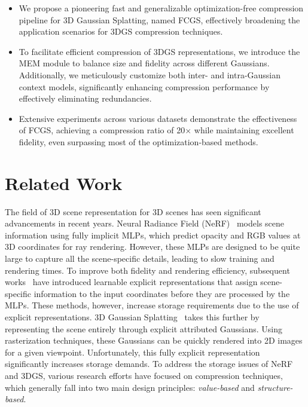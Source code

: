 \documentclass{article} %
\begin{document}
\begin{itemize} 
    \item We propose a pioneering fast and generalizable optimization-free compression pipeline for 3D Gaussian Splatting, named FCGS, effectively broadening the application scenarios for 3DGS compression techniques. 
    \item To facilitate  efficient compression of 3DGS representations, we introduce the MEM module to balance size and fidelity across different Gaussians. Additionally, we meticulously customize both inter- and intra-Gaussian context models, significantly enhancing compression performance by effectively eliminating redundancies. 
    \item Extensive experiments across various datasets demonstrate the effectiveness of FCGS, achieving a compression ratio of 20$\times$ while maintaining excellent fidelity, even surpassing most of the optimization-based methods. 
\end{itemize}

\section{Related Work}

The field of 3D scene representation for 3D scenes has seen significant advancements in recent years. Neural Radiance Field (NeRF)~\citep{NeRF} models scene information using fully implicit MLPs, which predict opacity and RGB values at 3D coordinates for ray rendering. However, these MLPs are designed to be quite large to capture all the scene-specific details, leading to slow training and rendering times. To improve both fidelity and rendering efficiency, subsequent works~\citep{INGP, TensoRF, DVGO} have introduced learnable explicit representations that assign scene-specific information to the input coordinates before they are processed by the MLPs. These methods, however, increase storage requirements due to the use of explicit representations. 3D Gaussian Splatting~\citep{3DGS} takes this further by representing the scene entirely through explicit attributed Gaussians. Using rasterization techniques, these Gaussians can be quickly rendered into 2D images for a given viewpoint. Unfortunately, this fully explicit representation significantly increases storage demands. To address the storage issues of NeRF and 3DGS, various research efforts have focused on compression techniques, which generally fall into two main design principles: \textit{value-based} and \textit{structure-based}.
\end{document}
